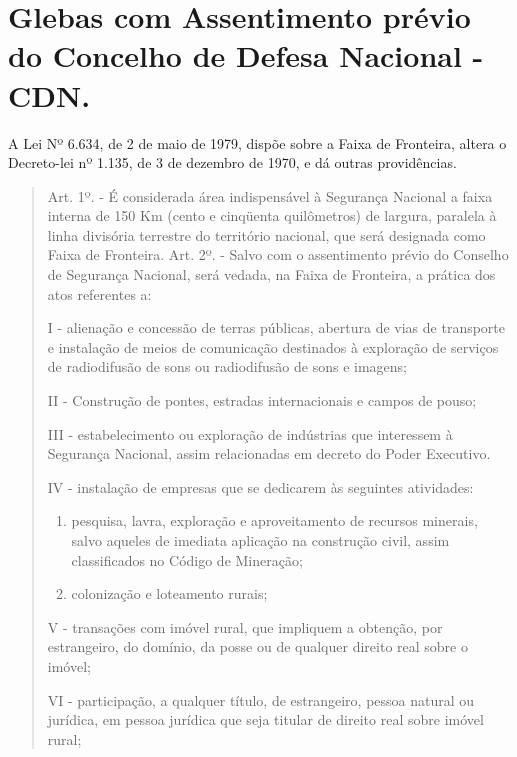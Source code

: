 \documentclass[
  letterpaper,
]{report}
\begin{document}

\hypertarget{glebas-com-assentimento-pruxe9vio-do-concelho-de-defesa-nacional---cdn.}{%
\chapter{Glebas com Assentimento prévio do Concelho de Defesa Nacional -
CDN.}\label{glebas-com-assentimento-pruxe9vio-do-concelho-de-defesa-nacional---cdn.}}

A Lei Nº 6.634, de 2 de maio de 1979, dispõe sobre a Faixa de Fronteira,
altera o Decreto-lei nº 1.135, de 3 de dezembro de 1970, e dá outras
providências.

\begin{quote}
Art. 1º. - É considerada área indispensável à Segurança Nacional a faixa
interna de 150 Km (cento e cinqüenta quilômetros) de largura, paralela à
linha divisória terrestre do território nacional, que será designada
como Faixa de Fronteira. Art. 2º. - Salvo com o assentimento prévio do
Conselho de Segurança Nacional, será vedada, na Faixa de Fronteira, a
prática dos atos referentes a:

I - alienação e concessão de terras públicas, abertura de vias de
transporte e instalação de meios de comunicação destinados à exploração
de serviços de radiodifusão de sons ou radiodifusão de sons e imagens;

II - Construção de pontes, estradas internacionais e campos de pouso;

III - estabelecimento ou exploração de indústrias que interessem à
Segurança Nacional, assim relacionadas em decreto do Poder Executivo.

IV - instalação de empresas que se dedicarem às seguintes atividades:

\begin{enumerate}
\def\labelenumi{\alph{enumi})}
\item
  pesquisa, lavra, exploração e aproveitamento de recursos minerais,
  salvo aqueles de imediata aplicação na construção civil, assim
  classificados no Código de Mineração;
\item
  colonização e loteamento rurais;
\end{enumerate}

V - transações com imóvel rural, que impliquem a obtenção, por
estrangeiro, do domínio, da posse ou de qualquer direito real sobre o
imóvel;

VI - participação, a qualquer título, de estrangeiro, pessoa natural ou
jurídica, em pessoa jurídica que seja titular de direito real sobre
imóvel rural;
\end{quote}
\end{document}
